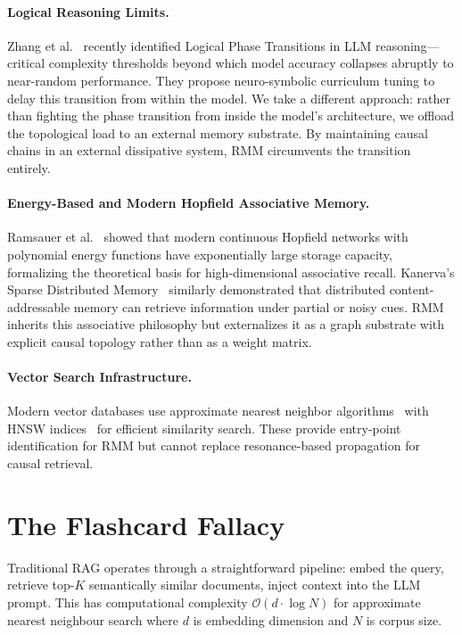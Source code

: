 \documentclass[11pt]{article}
\begin{document}
\paragraph{Logical Reasoning Limits.}
Zhang et al.~\cite{zhang2026lpt} recently identified Logical Phase
Transitions in LLM reasoning---critical complexity thresholds beyond
which model accuracy collapses abruptly to near-random performance. They
propose neuro-symbolic curriculum tuning to delay this transition from
within the model. We take a different approach: rather than fighting the
phase transition from inside the model's architecture, we offload the
topological load to an external memory substrate. By maintaining causal
chains in an external dissipative system, RMM circumvents the transition
entirely.

\paragraph{Energy-Based and Modern Hopfield Associative Memory.}
Ramsauer et al.~\cite{ramsauer2020hopfield} showed that modern
continuous Hopfield networks with polynomial energy functions have
exponentially large storage capacity, formalizing the theoretical basis
for high-dimensional associative recall. Kanerva's Sparse Distributed
Memory~\cite{kanerva1988} similarly demonstrated that distributed
content-addressable memory can retrieve information under partial or
noisy cues. RMM inherits this associative philosophy but externalizes it
as a graph substrate with explicit causal topology rather than as a
weight matrix.

\paragraph{Vector Search Infrastructure.}
Modern vector databases use approximate nearest neighbor
algorithms~\cite{johnson2019} with HNSW indices~\cite{malkov2018} for
efficient similarity search. These provide entry-point identification
for RMM but cannot replace resonance-based propagation for causal
retrieval.

\section{The Flashcard Fallacy}

Traditional RAG operates through a straightforward pipeline: embed the
query, retrieve top-$K$ semantically similar documents, inject context
into the LLM prompt. This has computational complexity
$\mathcal{O}(d \cdot \log N)$ for approximate nearest neighbour search
where $d$ is embedding dimension and $N$ is corpus size.
\end{document}
